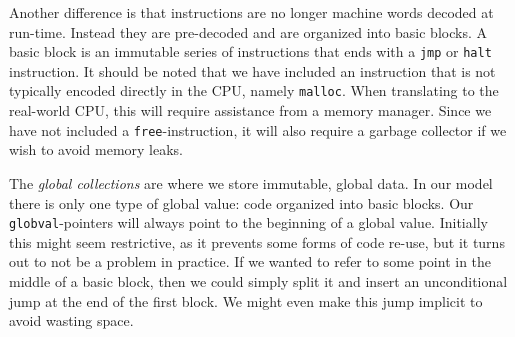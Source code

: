 Another difference is that instructions are no longer machine words decoded at
run-time. Instead they are pre-decoded and are organized into basic blocks. A
basic block is an immutable series of instructions that ends with a \texttt{jmp}
or \texttt{halt} instruction. It should be noted that we have included an
instruction that is not typically encoded directly in the CPU, namely
\texttt{malloc}. When translating to the real-world CPU, this will require
assistance from a memory manager. Since we have not included a
\texttt{free}-instruction, it will also require a garbage collector if we wish
to avoid memory leaks.

The \emph{global collections} are where we store immutable, global data. In our
model there is only one type of global value: code organized into basic
blocks. Our \texttt{globval}-pointers will always point to the beginning of a
global value. Initially this might seem restrictive, as it prevents some forms
of code re-use, but it turns out to not be a problem in practice. If we wanted
to refer to some point in the middle of a basic block, then we could simply
split it and insert an unconditional jump at the end of the first block. We
might even make this jump implicit to avoid wasting space.

